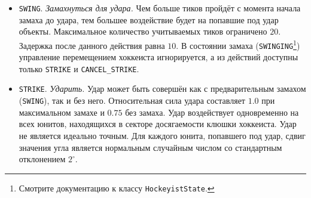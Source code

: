 \begin{itemize}
\begin{itemize}
{          $-\pi/12.0$ до $\pi/12.0$ радиан.}В противном случае действие игнорируется и не инициирует задержку. То же происходит и в случае,
          если хоккеист уже контролирует шайбу. Если шайба контролируется другим хоккеистом, то она будет перехвачена с вероятностью
          $25\%$\footnote[4]{Для любого вероятностного события в игре действуют следующие ограничения: если шанс свершения события меньше
          $5\%$, то он считается равным $5\%$; если шанс больше $95\%$, то он считается равным $95\%$.}Хоккеист, потерявший шайбу, не может
          совершать действия в течение $10$ тиков. Если шайба не контролируется другим хоккеистом и находится в состоянии покоя, то базовый
          шанс установить над ней контроль равен $160\%$. Это значение равномерно уменьшается с ростом скорости шайбы, достигая (но не
          останавливаясь на) $60\%$ при $20.0$ тиках$^{-1}$ --- скорости, придаваемой шайбе после удара по ней хоккеиста, находящегося в
          состоянии покоя. В случае успеха действия хоккеист становится владельцем шайбы. Это означает, что игровой симулятор в конце
          каждого тика устанавливает положение центра шайбы в точку перед хоккеистом на расстоянии $55.0$ от его центра.
    \item \texttt{SWING}. \textit{Замахнуться для удара.} Чем больше тиков пройдёт с момента начала замаха до удара, тем большее воздействие
          будет на попавшие под удар объекты. Максимальное количество учитываемых тиков ограничено $20$. Задержка после данного действия
          равна $10$. В состоянии замаха (\texttt{SWINGING}\footnote[5]{Смотрите документацию к классу \texttt{HockeyistState}.}) управление
          перемещением хоккеиста игнорируется, а из действий доступны только \texttt{STRIKE} и \texttt{CANCEL\_STRIKE}.
    \item \texttt{STRIKE}. \textit{Ударить.} Удар может быть совершён как с предварительным замахом (\texttt{SWING}), так и без него.
          Относительная сила удара составляет $1.0$ при максимальном замахе и $0.75$ без замаха. Удар воздействует одновременно на всех
          юнитов, находящихся в секторе досягаемости клюшки хоккеиста. Удар не является идеально точным. Для каждого юнита, попавшего под
          удар, сдвиг значения угла является нормальным случайным числом со стандартным отклонением $2^\circ$.


\end{itemize}
\end{itemize}
